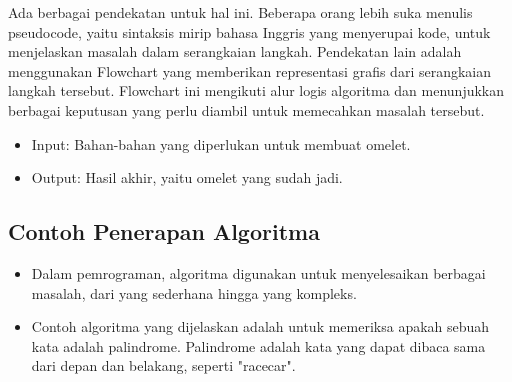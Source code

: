 \documentclass{article}
\begin{document}
Ada berbagai pendekatan untuk hal ini. Beberapa orang lebih suka menulis pseudocode, yaitu sintaksis mirip bahasa Inggris yang menyerupai kode, untuk menjelaskan masalah dalam serangkaian langkah. Pendekatan lain adalah menggunakan Flowchart yang memberikan representasi grafis dari serangkaian langkah tersebut. Flowchart ini mengikuti alur logis algoritma dan menunjukkan berbagai keputusan yang perlu diambil untuk memecahkan masalah tersebut.
\begin{itemize}
    \item Input: Bahan-bahan yang diperlukan untuk membuat omelet.
    \item Output: Hasil akhir, yaitu omelet yang sudah jadi.
\end{itemize}

\subsection{Contoh Penerapan Algoritma}
\begin{itemize}
    \item Dalam pemrograman, algoritma digunakan untuk menyelesaikan berbagai masalah, dari yang sederhana hingga yang kompleks.
    \item Contoh algoritma yang dijelaskan adalah untuk memeriksa apakah sebuah kata adalah palindrome. Palindrome adalah kata yang dapat dibaca sama dari depan dan belakang, seperti "racecar".
\end{itemize}
\end{document}
